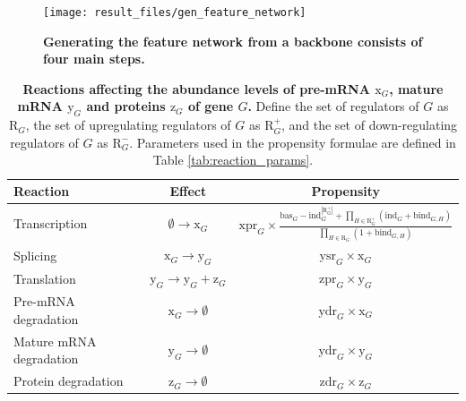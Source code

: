 \documentclass[
  table,
  10pt,
  a4paper]{article}
\begin{document}
\begin{figure}[H]
    \centering
    \texttt{[image: result\_files/gen\_feature\_network]}
    \caption{
        \textbf{Generating the feature network from a backbone consists of four main steps.}
    }
    \label{fig:gen_feature_network}
\end{figure}

\begin{table}[H]
    \caption{
      \textbf{Reactions affecting the abundance levels of pre-mRNA $\text{x}_{G}$, mature mRNA $\text{y}_{G}$ and proteins $\text{z}_{G}$ of gene $G$.} Define the set of regulators of $G$ as $\text{R}_{G}$, the set of upregulating regulators of $G$ as $\text{R}^+_{G}$, and the set of down-regulating regulators of $G$ as $\text{R}^-_{G}$. Parameters used in the propensity formulae are defined in Table \ref{tab:reaction_params}.
    } \label{tab:reaction_def}
    \centering
    \begin{tabular}{|lcc|}
        \hline
        Reaction & Effect & Propensity \\ \hline \hline
        Transcription & $\emptyset \rightarrow \text{x}_{G}$ & $\text{xpr}_{G} \times \frac{\text{bas}_{G} - \text{ind}_{G}^{|\text{R}^+_{G}|} + \prod\limits_{H \in \text{R}^+_{G}}(\text{ind}_{G} + \text{bind}_{G,H})}{\prod\limits_{H \in \text{R}_{G}}(1 + \text{bind}_{G,H})}$ \\
        Splicing & $\text{x}_{G} \rightarrow \text{y}_{G}$ & $\text{ysr}_{G} \times \text{x}_{G}$ \\
        Translation & $\text{y}_{G} \rightarrow \text{y}_{G} + \text{z}_{G}$ & $\text{zpr}_{G} \times \text{y}_{G}$ \\ \hline\hline
        Pre-mRNA degradation & $\text{x}_{G} \rightarrow \emptyset$ & $\text{ydr}_{G} \times \text{x}_{G}$ \\
        Mature mRNA degradation & $\text{y}_{G} \rightarrow \emptyset$ & $\text{ydr}_{G} \times \text{y}_{G}$ \\
        Protein degradation & $\text{z}_{G} \rightarrow \emptyset$ & $\text{zdr}_{G} \times \text{z}_{G}$ \\ \hline
    \end{tabular}
\end{table}
\end{document}
